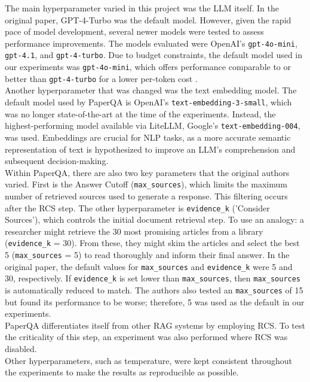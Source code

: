 The main hyperparameter varied in this project was the LLM itself. In the original paper, GPT-4-Turbo was the default model. However, given the rapid pace of model development, several newer models were tested to assess performance improvements. The models evaluated were OpenAI's \texttt{gpt-4o-mini}, \texttt{gpt-4.1}, and \texttt{gpt-4-turbo}. Due to budget constraints, the default model used in our experiments was \texttt{gpt-4o-mini}, which offers performance comparable to or better than \texttt{gpt-4-turbo} for a lower per-token cost \cite{noauthor_pricing_nodate}. \\

Another hyperparameter that was changed was the text embedding model. The default model used by PaperQA is OpenAI's \texttt{text-embedding-3-small}, which was no longer state-of-the-art at the time of the experiments. Instead, the highest-performing model available via LiteLLM, Google's \texttt{text-embedding-004}, was used. Embeddings are crucial for NLP tasks, as a more accurate semantic representation of text is hypothesized to improve an LLM's comprehension and subsequent decision-making. \\

Within PaperQA, there are also two key parameters that the original authors varied. First is the Answer Cutoff (\texttt{max\_sources}), which limits the maximum number of retrieved sources used to generate a response. This filtering occurs after the RCS step. The other hyperparameter is \texttt{evidence\_k} ('Consider Sources'), which controls the initial document retrieval step. To use an analogy: a researcher might retrieve the 30 most promising articles from a library (\texttt{evidence\_k} = 30). From these, they might skim the articles and select the best 5 (\texttt{max\_sources} = 5) to read thoroughly and inform their final answer. In the original paper, the default values for \texttt{max\_sources} and \texttt{evidence\_k} were 5 and 30, respectively. If \texttt{evidence\_k} is set lower than \texttt{max\_sources}, then \texttt{max\_sources} is automatically reduced to match. The authors also tested an \texttt{max\_sources} of 15 but found its performance to be worse; therefore, 5 was used as the default in our experiments.\\

PaperQA differentiates itself from other RAG systems by employing RCS. To test the criticality of this step, an experiment was also performed where RCS was disabled. \\

Other hyperparameters, such as temperature, were kept consistent throughout the experiments to make the results as reproducible as possible. \\


